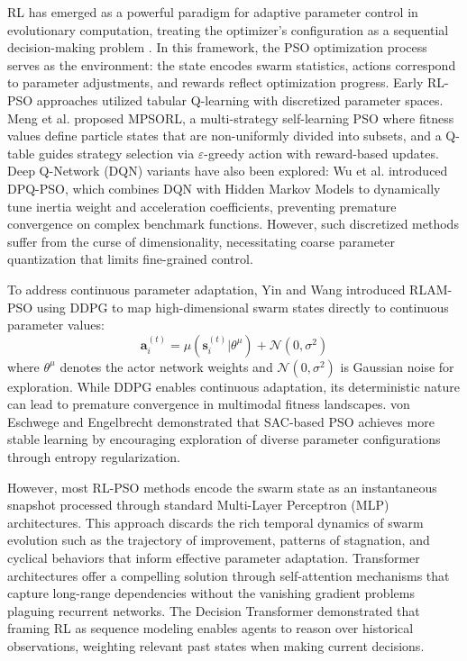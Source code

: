 \documentclass[fleqn,10pt]{wlscirep}
\begin{document}
RL has emerged as a powerful paradigm for adaptive parameter control in evolutionary computation, treating the optimizer's configuration as a sequential decision-making problem \cite{Bai2023}.
In this framework, the PSO optimization process serves as the environment: the state encodes swarm statistics, actions correspond to parameter adjustments, and rewards reflect optimization progress.
Early RL-PSO approaches utilized tabular Q-learning with discretized parameter spaces.
Meng et al. \cite{meng2023multi} proposed MPSORL, a multi-strategy self-learning PSO where fitness values define particle states that are non-uniformly divided into subsets, and a Q-table guides strategy selection via $\varepsilon$-greedy action with reward-based updates.
Deep Q-Network (DQN) variants have also been explored: Wu et al. \cite{wu2024dqnpso} introduced DPQ-PSO, which combines DQN with Hidden Markov Models to dynamically tune inertia weight and acceleration coefficients, preventing premature convergence on complex benchmark functions.
However, such discretized methods suffer from the curse of dimensionality, necessitating coarse parameter quantization that limits fine-grained control.

To address continuous parameter adaptation, Yin and Wang \cite{yin2023rlam} introduced RLAM-PSO using DDPG to map high-dimensional swarm states directly to continuous parameter values:
\begin{equation}
\mathbf{a}_i^{(t)} = \mu(\mathbf{s}_i^{(t)} | \theta^\mu) + \mathcal{N}(0, \sigma^2)
\label{eq:ddpg_action}
\end{equation}
where $\theta^\mu$ denotes the actor network weights and $\mathcal{N}(0, \sigma^2)$ is Gaussian noise for exploration.
While DDPG enables continuous adaptation, its deterministic nature can lead to premature convergence in multimodal fitness landscapes.
von Eschwege and Engelbrecht \cite{eschwege2024sacpso} demonstrated that SAC-based PSO achieves more stable learning by encouraging exploration of diverse parameter configurations through entropy regularization.

However, most RL-PSO methods encode the swarm state as an instantaneous snapshot processed through standard Multi-Layer Perceptron (MLP) architectures.
This approach discards the rich temporal dynamics of swarm evolution such as the trajectory of improvement, patterns of stagnation, and cyclical behaviors that inform effective parameter adaptation.
Transformer architectures \cite{vaswani2017attention} offer a compelling solution through self-attention mechanisms that capture long-range dependencies without the vanishing gradient problems plaguing recurrent networks.
The Decision Transformer \cite{chen2021decisiontransformer} demonstrated that framing RL as sequence modeling enables agents to reason over historical observations, weighting relevant past states when making current decisions.
\end{document}
